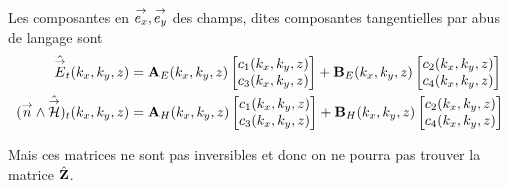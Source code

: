   Les composantes en \({\overset{\rightarrow}{e_x}},{\overset{\rightarrow}{e_y}}\) des champs, dites composantes tangentielles par abus de langage sont
  \begin{align*}
      \hat{{\overset{\rightarrow}{E}}}_t(k_x,k_y,z) &= \mathbf{A}_E(k_x,k_y,z) \begin{bmatrix}c_1(k_x,k_y,z) \\ c_3(k_x,k_y,z)\end{bmatrix} + \mathbf{B}_E(k_x,k_y,z) \begin{bmatrix}c_2(k_x,k_y,z) \\ c_4(k_x,k_y,z)\end{bmatrix}
      \\
      ({\overset{\rightarrow}{n}} \wedge \hat{{\overset{\rightarrow}{\mathcal{H}}}})_t(k_x,k_y,z) &= \mathbf{A}_H(k_x,k_y,z) \begin{bmatrix}c_1(k_x,k_y,z) \\ c_3(k_x,k_y,z)\end{bmatrix} + \mathbf{B}_H(k_x,k_y,z) \begin{bmatrix}c_2(k_x,k_y,z) \\ c_4(k_x,k_y,z)\end{bmatrix}
  \end{align*}

  Mais ces matrices ne sont pas inversibles et donc on ne pourra pas trouver la matrice \(\hat{\mathbf{Z}}\).
